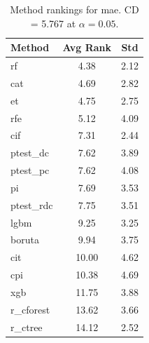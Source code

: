 \begin{table}[h]
\centering
\caption{Method rankings for mae. CD = 5.767 at $\alpha=0.05$.}
\label{tab:ranks_mae}
\begin{tabular}{lcc}
\toprule
Method & Avg Rank & Std \\
\midrule
rf & 4.38 & 2.12 \\
cat & 4.69 & 2.82 \\
et & 4.75 & 2.75 \\
rfe & 5.12 & 4.09 \\
cif & 7.31 & 2.44 \\
ptest_dc & 7.62 & 3.89 \\
ptest_pc & 7.62 & 4.08 \\
pi & 7.69 & 3.53 \\
ptest_rdc & 7.75 & 3.51 \\
lgbm & 9.25 & 3.25 \\
boruta & 9.94 & 3.75 \\
cit & 10.00 & 4.62 \\
cpi & 10.38 & 4.69 \\
xgb & 11.75 & 3.88 \\
r_cforest & 13.62 & 3.66 \\
r_ctree & 14.12 & 2.52 \\
\bottomrule
\end{tabular}
\end{table}